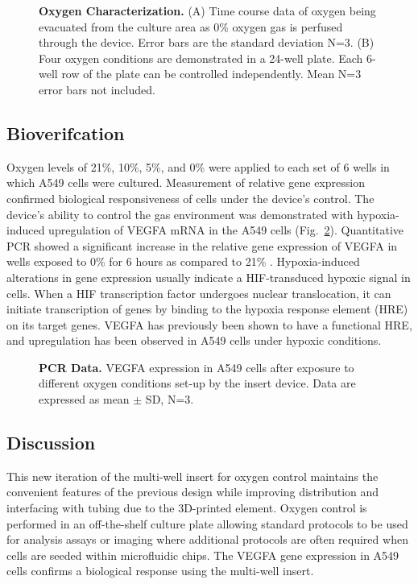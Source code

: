 \documentclass[10pt,letterpaper]{article}
\begin{document}
\begin{figure}[h]
\caption{
{\bf Oxygen Characterization.} 
(A) Time course data of oxygen being evacuated from the culture area as 0\% oxygen gas is perfused through the device.
Error bars are the standard deviation N=3.
(B) Four oxygen conditions are demonstrated in a 24-well plate.
Each 6-well row of the plate can be controlled independently.  
Mean N=3 error bars not included.
}
\label{fig2}
\end{figure}

\subsection*{Bioverifcation}

Oxygen levels of 21\%, 10\%, 5\%, and 0\% were applied to each set of 6 wells in which A549 cells were cultured.
Measurement of relative gene expression confirmed biological responsiveness of cells under the device’s control.
The device’s ability to control the gas environment was demonstrated with hypoxia-induced upregulation of VEGFA mRNA in the A549 cells (Fig.~\ref{fig3}).  Quantitative PCR showed a significant increase in the relative gene expression of VEGFA in wells exposed to 0\%  for 6 hours as compared to 21\% . Hypoxia-induced alterations in gene expression usually indicate a HIF-transduced hypoxic signal in cells.
When a HIF transcription factor undergoes nuclear translocation, it can initiate transcription of genes by binding to the hypoxia response element (HRE)\cite{Lee2004} on its target genes.
VEGFA has previously been shown to have a functional HRE, and upregulation has been observed in A549 cells under hypoxic conditions\cite{RohrerBley2011}.

\begin{figure}[h]
\caption{
{\bf PCR Data.}  VEGFA expression in A549 cells after exposure to different oxygen conditions set-up by the insert device. Data are expressed as mean $\pm$ SD, N=3.
}
\label{fig3}
\end{figure}

\subsection*{Discussion}
This new iteration of the multi-well insert for oxygen control maintains the convenient features of the previous design while improving distribution and interfacing with tubing due to the 3D-printed element.
Oxygen control is performed in an off-the-shelf culture plate allowing standard protocols to be used for analysis assays or imaging where additional protocols are often required when cells are seeded within microfluidic chips.
The VEGFA gene expression in A549 cells confirms a biological response using the multi-well insert.
\end{document}
